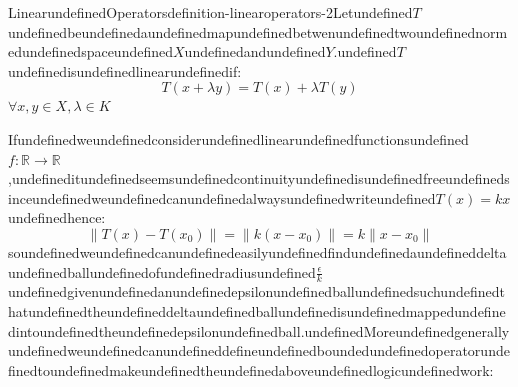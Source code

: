 \begin{mystthmdefinition}{LinearundefinedOperators}{definition-linearoperators-2}Letundefined$T$undefinedbeundefinedaundefinedmapundefinedbetwenundefinedtwoundefinednormedundefinedspaceundefined$X$undefinedandundefined$Y$.undefined$T$undefinedisundefinedlinearundefinedif:
\begin{equation}
T(x+\lambda y) = T(x) +\lambda T(y)
\end{equation}
$\forall x,y \in X, \lambda \in K$

\end{mystthmdefinition}
Ifundefinedweundefinedconsiderundefinedlinearundefinedfunctionsundefined$f:\mathbb{R}\to \mathbb{R}$,undefineditundefinedseemsundefinedcontinuityundefinedisundefinedfreeundefinedsinceundefinedweundefinedcanundefinedalwaysundefinedwriteundefined$T(x)=kx$undefinedhence:
\begin{equation}
\|T(x)-T(x_0)\|=\|k(x-x_0)\|=k\|x-x_0\|
\end{equation}
soundefinedweundefinedcanundefinedeasilyundefinedfindundefinedaundefineddeltaundefinedballundefinedofundefinedradiusundefined$\frac{\epsilon}{k}$undefinedgivenundefinedanundefinedepsilonundefinedballundefinedsuchundefinedthatundefinedtheundefineddeltaundefinedballundefinedisundefinedmappedundefinedintoundefinedtheundefinedepsilonundefinedball.undefinedMoreundefinedgenerallyundefinedweundefinedcanundefineddefineundefinedboundedundefinedoperatorundefinedtoundefinedmakeundefinedtheundefinedaboveundefinedlogicundefinedwork:

